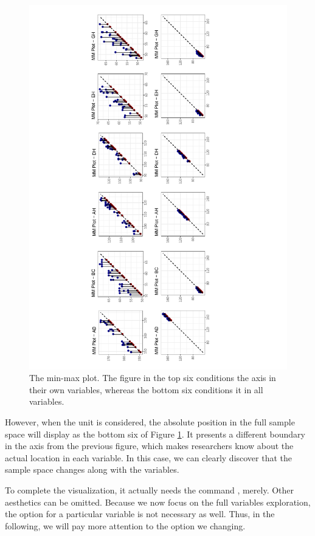 \documentclass[article]{jss}
\begin{document}
\begin{figure}[htbp]
    \centering
    \includegraphics[trim=5cm 0.5cm 6cm 0.5cm,angle=-90,width=1\textwidth, clip]{mmplot.pdf} 
   \caption{\label{fig:minmax} The min-max plot. The figure in the top six conditions the axis in their own variables, whereas the bottom six conditions it in all variables.}
\end{figure}

However, when the unit is considered, the absolute position in the full sample space will display as the bottom six of Figure \ref{fig:minmax}. It presents a different boundary in the axis from the previous figure, which makes researchers know about the actual location in each variable. In this case, we can clearly discover that the sample space changes along with the variables.

To complete the visualization, it actually needs the command , merely. Other aesthetics can be omitted. Because we now focus on the full variables exploration, the  option for a particular variable is not necessary as well. Thus, in the following, we will pay more attention to the option we changing.
\end{document}
